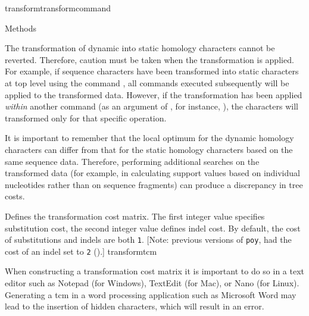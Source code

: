 \begin{command}{transform}{transformcommand}
\begin{arguments}
\begin{argumentgroup}{Methods}
            \begin{statement}
  	  The transformation of dynamic into static homology characters cannot be reverted.
	  Therefore, caution must be taken when the transformation is applied. For example,
	  if sequence characters have been transformed into static characters at top level using
	  the command , all commands executed 
	  subsequently will be applied to the transformed data. However, if the transformation has 
	  been applied \emph{within} another command (as an argument of , 
	  for instance, ), the characters will 
	  transformed only for that specific operation.
	   \end{statement}
	
	\begin{statement}
  	  It is important to remember that the local optimum for the dynamic homology
	  characters can differ from that for the static homology characters based on the
	  same sequence data. Therefore, performing additional searches on the transformed
	  data (for example, in calculating support values based on individual nucleotides
	  rather than on sequence fragments) can produce a discrepancy in tree costs.
	\end{statement}

            {Defines the transformation cost matrix. The first integer value specifies
            substitution cost, the second integer value defines indel cost. By default,
            the cost of substitutions and indels are both \texttt{1}.  [Note: previous versions of \texttt{poy}, had
            the cost of an indel set to \texttt{2} ().]}
            {transformtcm}
            
            	\begin{statement}
  	  When constructing a transformation cost matrix it is important to do so in a text editor 
	  such as Notepad (for Windows), TextEdit (for Mac), or Nano (for Linux). Generating a tcm in 
	  a word processing application such as Microsoft Word may lead to the insertion of hidden 
	  characters, which will result in an error.
	\end{statement}


\end{argumentgroup}
\end{arguments}
\end{command}
